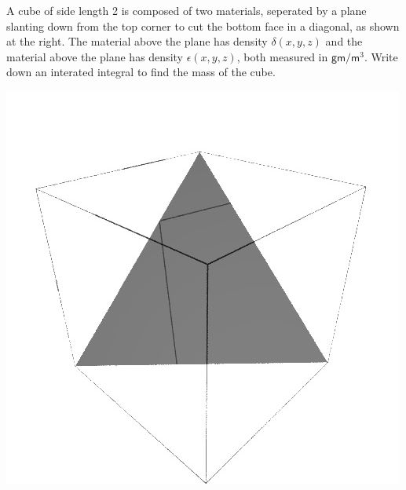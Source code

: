 \documentclass[12pt,addpoints]{exam}
\begin{document}
\begin{questions}
\begin{multicols}{2}
\question[25] A cube of side length 2 is composed
of two materials, seperated by a plane slanting down
from the top corner to cut the bottom face in a diagonal,
as shown at the right. The material above the plane
has density $\delta\left(x,y,z\right)$ and the material
above the plane has density $\epsilon\left(x,y,z\right)$,
both measured in $\mathsf{gm}/\mathsf{m}^3$.
Write down an interated integral to find the mass of the cube.
\begin{center}\includegraphics[scale=.4]{BoxPlane}\end{center}
\end{multicols}

\question[25] 
\begin{parts}

\end{parts}
\end{questions}
\end{document}
